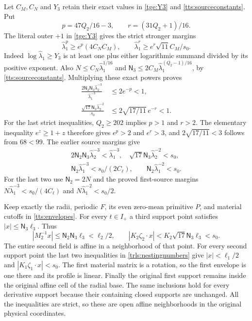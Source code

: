 Let $C_M,C_N$ and $Y_3$ retain their exact values in
\eqref{tge:Y3} and \eqref{tts:sourceconstants}. Put
\[
 p=47Q_2/16-3,\qquad r=(31Q_2+1)/16.
\]
The literal outer $+1$ in \eqref{tge:Y3} gives the strict
stronger margins
\begin{equation}\label{trls:sourcemargins}
 \widehat\lambda_1^p\geq e^p(4C_NC_M),\qquad
 \widehat\lambda_1^r\geq e^r\sqrt{11}C_M/s_0.
\end{equation}
Indeed $\log\widehat\lambda_1\geq Y_3$ is at least one
plus either logarithmic summand divided by its positive exponent.
Also $N\leq C_N\widehat\lambda_1^{1/16}$ and
$\mathsf N_3\leq2C_M
\widehat\lambda_1^{(Q_2-1)/16}$, by
\eqref{tts:sourceconstants}. Multiplying these exact powers
proves
\begin{align*}
 \frac{2\mathsf N_2\mathsf N_3
                  \widehat\lambda_2^{-3}}
      {\widehat\lambda_1^{-3}}&\leq2e^{-p}<1,\\
 \frac{\sqrt{17}\mathsf N_3
                  \widehat\lambda_2^{-2}}{s_0}
     &\leq2\sqrt{17/11}\,e^{-r}<1.
\end{align*}
For the last strict inequalities, $Q_2\geq202$ implies
$p>1$ and $r>2$. The elementary inequality $e^z\geq1+z$
therefore gives $e^p>2$ and $e^r>3$, and
$2\sqrt{17/11}<3$ follows from $68<99$.
The earlier source margins give
\begin{equation}\label{trls:nestingnumbers}
 \begin{gathered}
 2\mathsf N_2\mathsf N_3\widehat\lambda_2^{-3}
      <\widehat\lambda_1^{-3},\quad
 \sqrt{17}\mathsf N_3\widehat\lambda_2^{-2}<s_0,\\
 \mathsf N_2\widehat\lambda_1^{-3}<s_0/(2C_\ell),
 \qquad \mathsf N_2\widehat\lambda_1^{-2}<s_0.
 \end{gathered}
\end{equation}
For the last two use $\mathsf N_2=2N$ and the proved
first-source margins $N\widehat\lambda_1^{-3}
<s_0/(4C_\ell)$ and $N\widehat\lambda_1^{-2}<s_0/2$.

Keep exactly the radii, periodic $F$, its even zero-mean primitive
$P$, and material cutoffs in \eqref{tts:envelopes}.
For every $t\in I_+$ a third support point satisfies
$|x|\leq\mathsf N_3\ell_3$. Thus
\[
 |M_2^{-1}x|\leq\mathsf N_2\mathsf N_3\ell_3<\ell_2/2,
 \qquad |K_2\zeta_2\cdot x|
    <K_2\sqrt{17}\mathsf N_3\ell_3<s_0.
\]
The entire second field is affine in a neighborhood of that point.
For every second support point the last two inequalities in
\eqref{trls:nestingnumbers} give $|x|<\ell_1/2$ and
$|K_1\zeta_1\cdot x|<s_0$. The first material matrix is
a rotation, so the first envelope is one there and its profile
is linear. Finally the original first support remains inside the
original affine cell of the radial base. The same inclusions hold
for every derivative support because their containing closed supports
are unchanged. All the inequalities are strict, so these are open
affine neighborhoods in the original physical coordinates.

